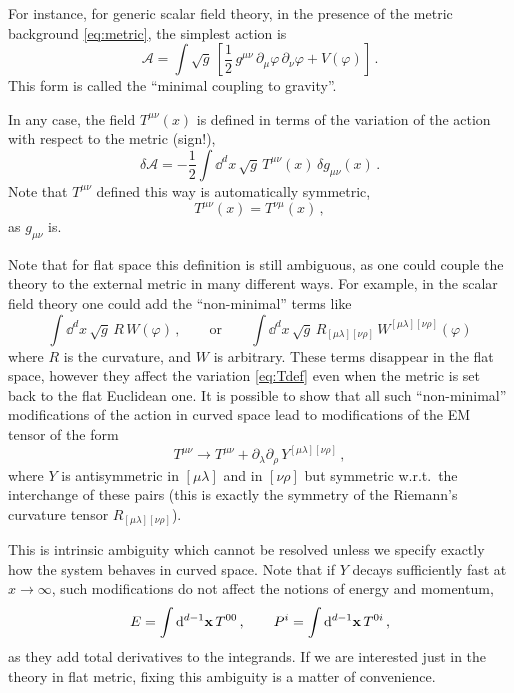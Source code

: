 For instance, for generic scalar field theory, in the presence of the metric
background \eqref{eq:metric}, the simplest action is
\[
\mathcal A=\int\sqrt g\,\left[\frac12\,g^{\mu\nu}\,\partial_\mu\varphi\,\partial_\nu\varphi+V(\varphi)\right]\,.
\]
This form is called the ``minimal coupling to gravity''.

In any case, the field $T^{\mu\nu}(x)$ is defined in terms of the variation of the
action with respect to the metric (sign!),
\begin{equation}\label{eq:Tdef}
\delta\mathcal A=-\frac12\int \dd^dx\,\sqrt g\,T^{\mu\nu}(x)\,\delta g_{\mu\nu}(x)\,.
\end{equation}
Note that $T^{\mu\nu}$ defined this way is automatically symmetric,
\[
T^{\mu\nu}(x)=T^{\nu\mu}(x)\,,
\]
as $g_{\mu\nu}$ is.

Note that for flat space this definition is still ambiguous, as one could couple
the theory to the external metric in many different ways. For example, in the
scalar field theory one could add the ``non-minimal'' terms like
\[
\int \dd^dx\,\sqrt g\,R\,W(\varphi)\,,\qquad\text{or}\qquad\int \dd^dx\,\sqrt g\,R_{[\mu\lambda][\nu\rho]}\,W^{[\mu\lambda][\nu\rho]}(\varphi)
\]
where $R$ is the curvature, and $W$ is arbitrary. These terms disappear in the flat
space, however they affect the variation \eqref{eq:Tdef} even when the metric is
set back to the flat Euclidean one. It is possible to show that all such
``non-minimal'' modifications of the action in curved space lead to modifications
of the EM tensor of the form
\begin{equation}\label{eq:Tambig}
T^{\mu\nu}\to T^{\mu\nu}+\partial_\lambda\partial_\rho\,Y^{[\mu\lambda][\nu\rho]}\,,
\end{equation}
where $Y$ is antisymmetric in $[\mu\lambda]$ and in $[\nu\rho]$ but symmetric
w.r.t.\ the interchange of these pairs (this is exactly the symmetry of the
Riemann's curvature tensor $R_{[\mu\lambda][\nu\rho]}$).

This is intrinsic ambiguity which cannot be resolved unless we specify exactly how
the system behaves in curved space. Note that if $Y$ decays sufficiently fast at
$x\to\infty$, such modifications do not affect the notions of energy and momentum,
\[
E=\int \mathop{}\!\mathrm{d}^{d-1}\mathbf{x}\,T^{00}\,,\qquad P^i=\int \mathop{}\!\mathrm{d}^{d-1}\mathbf{x}\,T^{0i}\,,
\]
as they add total derivatives to the integrands. If we are interested just in the
theory in flat metric, fixing this ambiguity is a matter of convenience.


